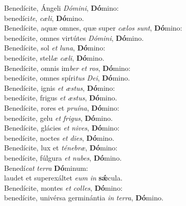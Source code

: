 \evenverse Benedícite, Ángeli \textit{Dó}\textit{mi}\textit{ni}, \textbf{Dó}mino:~\*\\
\evenverse benedíci\textit{te}, \textit{cæ}\textit{li}, \textbf{Dó}mino.\\
\oddverse Benedícite, aquæ omnes, quæ super \textit{cæ}\textit{los} \textit{sunt}, \textbf{Dó}mino:~\*\\
\oddverse benedícite, omnes virtútes \textit{Dó}\textit{mi}\textit{ni}, \textbf{Dó}mino.\\
\evenverse Benedícite, sol \textit{et} \textit{lu}\textit{na}, \textbf{Dó}mino:~\*\\
\evenverse benedícite, stel\textit{læ} \textit{cæ}\textit{li}, \textbf{Dó}mino.\\
\oddverse Benedícite, omnis im\textit{ber} \textit{et} \textit{ros}, \textbf{Dó}mino:~\*\\
\oddverse benedícite, omnes spíri\textit{tus} \textit{De}\textit{i}, \textbf{Dó}mino.\\
\evenverse Benedícite, ignis \textit{et} \textit{æ}\textit{stus}, \textbf{Dó}mino:~\*\\
\evenverse benedícite, frigus \textit{et} \textit{æ}\textit{stus}, \textbf{Dó}mino.\\
\oddverse Benedícite, rores et \textit{pru}\textit{í}\textit{na}, \textbf{Dó}mino:~\*\\
\oddverse benedícite, gelu \textit{et} \textit{fri}\textit{gus}, \textbf{Dó}mino.\\
\evenverse Benedícite, glácies \textit{et} \textit{ni}\textit{ves}, \textbf{Dó}mino:~\*\\
\evenverse benedícite, noctes \textit{et} \textit{di}\textit{es}, \textbf{Dó}mino.\\
\oddverse Benedícite, lux et \textit{té}\textit{ne}\textit{bræ}, \textbf{Dó}mino:~\*\\
\oddverse benedícite, fúlgura \textit{et} \textit{nu}\textit{bes}, \textbf{Dó}mino.\\
\evenverse Benedí\textit{cat} \textit{ter}\textit{ra} \textbf{Dó}minum:~\*\\
\evenverse laudet et superexáltet \textit{e}\textit{um} \textit{in} \textbf{sǽ}cula.\\
\oddverse Benedícite, montes \textit{et} \textit{col}\textit{les}, \textbf{Dó}mino:~\*\\
\oddverse benedícite, univérsa germinántia \textit{in} \textit{ter}\textit{ra}, \textbf{Dó}mino.\\
